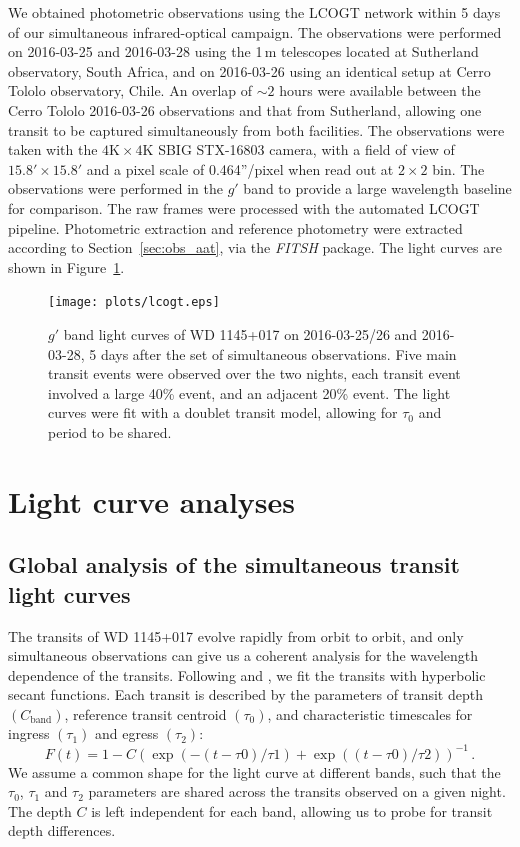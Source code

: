 \documentclass[iop,useAMES,usenatbig]{emulateapj}
\begin{document}
We obtained photometric observations using the LCOGT network within 5 days of our simultaneous infrared-optical campaign. The observations were performed on 2016-03-25 and 2016-03-28 using the 1\,m telescopes located at Sutherland observatory, South Africa, and on 2016-03-26 using an identical setup at Cerro Tololo observatory, Chile. An overlap of $\sim 2$ hours were available between the Cerro Tololo 2016-03-26 observations and that from Sutherland, allowing one transit to be captured simultaneously from both facilities. The observations were taken with the $4\mathrm{K} \times 4 \mathrm{K}$ SBIG STX-16803 camera, with a field of view of $15.8'\times 15.8'$ and a pixel scale of 0.464''/pixel when read out at $2\times 2$ bin. The observations were performed in the $g'$ band to provide a large wavelength baseline for comparison. The raw frames were processed with the automated LCOGT pipeline. Photometric extraction and reference photometry were extracted according to Section~\ref{sec:obs_aat}, via the \emph{FITSH} package. The light curves are shown in Figure~\ref{fig:lcogt}.

\begin{figure}
    \centering
    \texttt{[image: plots/lcogt.eps]}
    \caption{$g'$ band light curves of WD 1145+017 on 2016-03-25/26 and 2016-03-28, 5 days after the set of simultaneous observations. Five main transit events were observed over the two nights, each transit event involved a large 40\% event, and an adjacent 20\% event. The light curves were fit with a doublet transit model, allowing for $\tau_0$ and period to be shared.}
    \label{fig:lcogt}
\end{figure}



\section{Light curve analyses}
\label{sec:lightcurve_model}

\subsection{Global analysis of the simultaneous transit light curves}
\label{sec:simultaneous_lc}

The transits of WD 1145+017 evolve rapidly from orbit to orbit, and only simultaneous observations can give us a coherent analysis for the wavelength dependence of the transits. Following \citet{2014ApJ...784...40R} and \citet{2015arXiv151006434C}, we fit the transits with hyperbolic secant functions. Each transit is described by the parameters of transit depth $(C_\mathrm{band})$, reference transit centroid $(\tau_0)$, and characteristic timescales for ingress $(\tau_1)$ and egress $(\tau_2)$:
\begin{equation}
\label{eq:model}
  F(t) = 1 - C \left( \exp(-(t-\tau0)/\tau1) + \exp((t-\tau0)/\tau2) \right)^{-1}\,.
\end{equation}
We assume a common shape for the light curve at different bands, such that the $\tau_0$, $\tau_1$ and $\tau_2$ parameters are shared across the transits observed on a given night. The depth $C$ is left independent for each band, allowing us to probe for transit depth differences.
\end{document}
